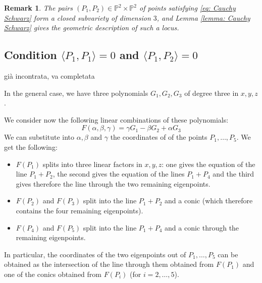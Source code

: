 \documentclass{amsart}
\theoremstyle{plain}
\newtheorem{rmk}[theorem]{Remark}
\theoremstyle{definition}
\newcommand{\p}{\mathbb{P}}
\newcommand{\scl}[2]{\langle #1, #2 \rangle}
\begin{document}
\begin{rmk}
The pairs $(P_1, P_2) \in \p^2 \times \p^2$ of points satisfying \eqref{eq: Cauchy Schwarz}
form a closed subvariety of dimension $3$, and Lemma \ref{lemma: Cauchy Schwarz} gives the geometric description of such a locus.

\end{rmk}

\subsection{Condition $\scl{P_1}{P_1} = 0$ and $\scl{P_1}{P_2}=0$}
gi\`a incontrata, va completata

In the general case, we have three polynomials $G_1, G_2, G_3$ of degree
three in $x, y, z$.

We consider now the following linear combinations of these polynomials:
\begin{equation}
F(\alpha, \beta, \gamma) = \gamma G_1 - \beta G_2 +\alpha G_3
\end{equation}
We can substitute into $\alpha, \beta$ and $\gamma$ the coordinates of
of the points $P_1, \dots, P_5$.
We get the following:
\begin{itemize}
\item $F(P_1)$ splits into three linear factors in $x, y, z$: one gives
  the equation of
  the line $P_1+P_2$, the second gives the equation of the lines $P_1+P_4$
  and the third gives therefore the line through the two remaining eigenpoints.
\item $F(P_2)$ and $F(P_3)$ split into the line $P_1+P_2$ and a conic
  (which therefore contains the four remaining eigenpoints).
\item $F(P_4)$ and $F(P_5)$ split into the line $P_1+P_4$ and a conic
  through the remaining eigenpoints.
\end{itemize}
In particular, the coordinates of the two eigenpoints out of
$P_1, \dots, P_5$ can be obtained as the intersection of the line through them
obtained from $F(P_1)$ and one of the conics obtained from $F(P_i)$ (for
$i= 2, \dots, 5$).  
\end{document}
